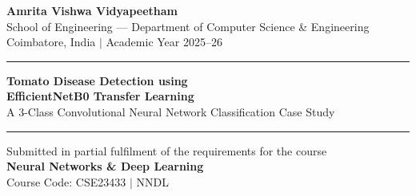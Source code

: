 \documentclass[12pt, a4paper, onecolumn]{IEEEtran}
\begin{document}

\begin{titlepage}
  \centering
  \vspace*{10mm}

  {\Large\bfseries Amrita Vishwa Vidyapeetham}\\[2mm]
  {\normalsize School of Engineering --- Department of Computer Science \& Engineering}\\[1mm]
  {\normalsize Coimbatore, India \quad $\vert$ \quad Academic Year 2025--26}

  \vspace{10mm}
  \rule{\linewidth}{1.2pt}
  \vspace{8mm}

  {\LARGE\bfseries
    Tomato Disease Detection using\\[6pt]
    EfficientNetB0 Transfer Learning}\\[4mm]
  {\large A 3-Class Convolutional Neural Network Classification Case Study}

  \vspace{8mm}
  \rule{\linewidth}{0.8pt}
  \vspace{10mm}

  {\normalsize
    Submitted in partial fulfilment of the requirements for the course}\\[3mm]
  {\large\bfseries Neural Networks \& Deep Learning}\\[1mm]
  {\normalsize Course Code: CSE23433 \quad $\vert$ \quad NNDL}

  \vspace{14mm}


\end{titlepage}
\end{document}
